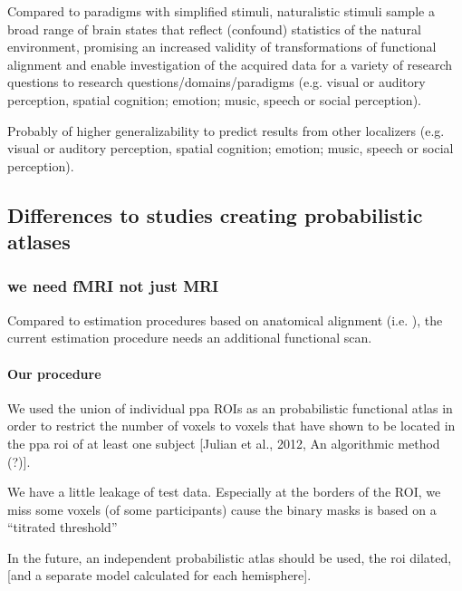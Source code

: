 %
Compared to paradigms with simplified stimuli, naturalistic stimuli sample a
broad range of brain states \citep{guntupalli2016model, haxby2011common} that
reflect (confound) statistics of the natural environment, promising an increased
validity of transformations of functional alignment and enable investigation
of the acquired data for a variety of research questions to research
questions/domains/paradigms (e.g.  visual or auditory perception, spatial
cognition; emotion; music, speech or social perception).

%
Probably of higher generalizability to predict results from other localizers
(e.g.  visual or auditory perception, spatial cognition; emotion;
music, speech or social perception).








\subsection{Differences to studies creating probabilistic atlases}

\subsubsection{we need fMRI not just MRI}

%
Compared to estimation procedures based on anatomical alignment (i.e.
\citep{weiner2018defining}), the current estimation procedure needs an
additional functional scan.





\paragraph{Our procedure}

%
We used the union of individual \ac{ppa} ROIs as an probabilistic functional
atlas in order to restrict the number of voxels to voxels that have shown to be
located in the \ac{ppa} \ac{roi} of at least one subject [Julian et al., 2012,
An algorithmic method (?)].

%
We have a little leakage of test data.
%
Especially at the borders of the ROI, we miss some voxels (of some participants)
cause the binary masks is based on a ``titrated threshold''
\citep{sengupta2016extension}

%
In the future, an independent probabilistic atlas should be used, the \ac{roi}
dilated, [and a separate model calculated for each hemisphere].


